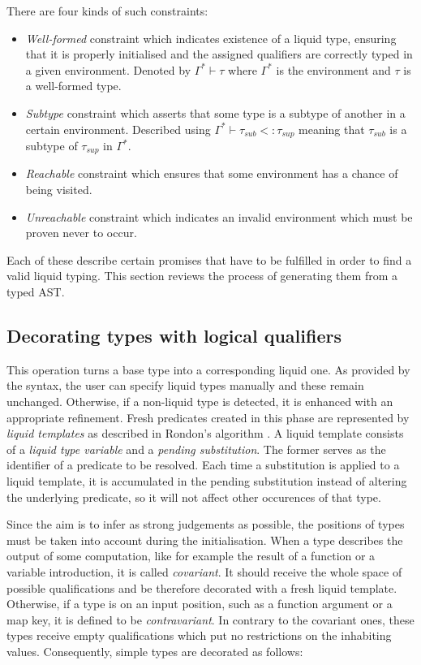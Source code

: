 There are four kinds of such constraints:
\begin{itemize}
\item \emph{Well-formed} constraint which indicates existence of a liquid type,
  ensuring that it is properly initialised and the assigned qualifiers are
  correctly typed in a given environment. Denoted by $\Gamma^* \vdash \tau$
  where $\Gamma^*$ is the environment and $\tau$ is a well-formed type.
\item \emph{Subtype} constraint which asserts that some type is a subtype of
  another in a certain environment. Described using $\Gamma^* \vdash \tau_{sub}
  <: \tau_{sup}$ meaning that $\tau_{sub}$ is a subtype of $\tau_{sup}$ in
  $\Gamma^*$.
\item \emph{Reachable} constraint which ensures that some environment has a
  chance of being visited.
\item \emph{Unreachable} constraint which indicates an invalid environment which
  must be proven never to occur.
\end{itemize}

Each of these describe certain promises that have to be fulfilled in order to
find a valid liquid typing. This section reviews the process of generating them
from a typed AST.

\subsection{Decorating types with logical qualifiers}

This operation turns a base type into a corresponding liquid one. As provided by
the syntax, the user can specify liquid types manually and these remain
unchanged. Otherwise, if a non-liquid type is detected, it is enhanced with an
appropriate refinement. Fresh predicates created in this phase are represented
by \emph{liquid templates} as described in Rondon's algorithm \cite{liquid}. A
liquid template consists of a \emph{liquid type variable} and a \emph{pending
  substitution}. The former serves as the identifier of a predicate to be
resolved. Each time a substitution is applied to a liquid template, it is
accumulated in the pending substitution instead of altering the underlying
predicate, so it will not affect other occurences of that type.

Since the aim is to infer as strong judgements as possible, the positions of
types must be taken into account during the initialisation. When a type
describes the output of some computation, like for example the result of a
function or a variable introduction, it is called \emph{covariant}. It should
receive the whole space of possible qualifications and be therefore decorated
with a fresh liquid template. Otherwise, if a type is on an input position, such
as a function argument or a map key, it is defined to be \emph{contravariant}.
In contrary to the covariant ones, these types receive empty qualifications
which put no restrictions on the inhabiting values. Consequently, simple types
are decorated as follows:

